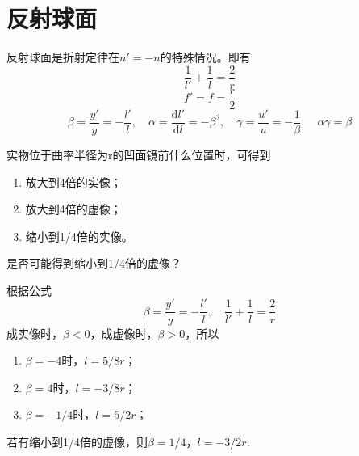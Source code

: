\documentclass[cn,10pt,chinesefont=founder,math=newtx,cite=super,twoside]{elegantbook}
\begin{document}
\section{反射球面}
反射球面是折射定律在$n'=-n$的特殊情况。即有
\begin{equation}
\frac{1}{l'}+\frac{1}{l}=\frac{2}{r}
\end{equation}
\begin{equation}
f'=f=\frac{r}{2}
\end{equation}
\begin{equation}
\beta=\frac{y'}{y}=-\frac{l'}{l},\quad
\alpha=\frac{\mathrm{d}l'}{\mathrm{d}l}=-\beta^2,\quad
\gamma=\frac{u'}{u}=-\frac{1}{\beta},\quad
\alpha\gamma=\beta
\end{equation}

\begin{problem}
	实物位于曲率半径为r的凹面镜前什么位置时，可得到
	\begin{enumerate}
		\item 放大到4倍的实像；
		\item 放大到4倍的虚像；
		\item 缩小到1/4倍的实像。
	\end{enumerate}
	是否可能得到缩小到1/4倍的虚像？
\end{problem}
\begin{solution}
根据公式
\begin{equation}
\beta=\frac{y'}{y}=-\frac{l'}{l},\quad \frac{1}{l'}+\frac{1}{l}=\frac{2}{r} \nonumber
\end{equation}
成实像时，$\beta<0$，成虚像时，$\beta>0$，所以
\begin{enumerate}
	\item $\beta=-4$时，$l=5/8r$；
	\item $\beta=4$时，$l=-3/8r$；
	\item $\beta=-1/4$时，$l=5/2r$；
\end{enumerate}
若有缩小到1/4倍的虚像，则$\beta=1/4$，$l=-3/2r$.
\end{solution}
\end{document}
